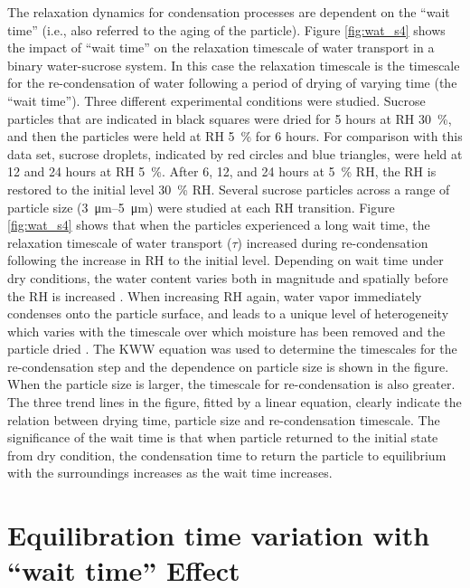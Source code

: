 The relaxation dynamics for condensation processes are dependent on the ``wait time'' (i.e., also referred to the aging of the particle). Figure \ref{fig:wat_s4} shows the impact of ``wait time'' on the relaxation timescale of water transport in a binary water-sucrose system. In this case the relaxation timescale is the timescale for the re-condensation of water following a period of drying of varying time (the ``wait time''). Three different experimental conditions were studied. Sucrose particles that are indicated in black squares were dried for \num{5} hours at RH \SI{30}{\percent}, and then the particles were held at RH \SI{5}{\percent} for \num{6} hours. For comparison with this data set, sucrose droplets, indicated by red circles and blue triangles, were held at \num{12} and \num{24} hours at RH \SI{5}{\percent}. After \num{6}, \num{12}, and \num{24} hours at \SI{5}{\percent} RH, the RH is restored to the initial level \SI{30}{\percent} RH. Several sucrose particles across a range of particle size (\SIrange[range-phrase=\text{--}]{3}{5}{\micro\meter}) were studied at each RH transition. Figure \ref{fig:wat_s4} shows that when the particles experienced a long wait time, the relaxation timescale of water transport ($\tau$) increased during re-condensation following the increase in RH to the initial level. Depending on wait time under dry conditions, the water content varies both in magnitude and spatially before the RH is increased \cite{Rickards2015}. When increasing RH again, water vapor immediately condenses onto the particle surface, and leads to a unique level of heterogeneity which varies with the timescale over which moisture has been removed and the particle dried \cite{Rickards2015,luTimescalesWaterTransport2014}. The KWW equation was used to determine the timescales for the re-condensation step and the dependence on particle size is shown in the figure. When the particle size is larger, the timescale for re-condensation is also greater. The three trend lines in the figure, fitted by a linear equation, clearly indicate the relation between drying time, particle size and re-condensation timescale. The significance of the wait time is that when particle returned to the initial state from dry condition, the condensation time to return the particle to equilibrium with the surroundings increases as the wait time increases. 
\section{Equilibration time variation with ``wait time'' Effect}


